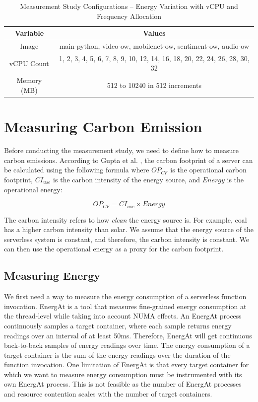 \documentclass[times, 10pt,twocolumn]{article}
\begin{document}
\begin{table}[htbp]
  \centering
  \begin{tabular}{|c|c|}
  \hline
  \textbf{Variable} & \textbf{Values} \\ \hline
  Image & main-python, video-ow, mobilenet-ow, sentiment-ow, audio-ow \\ \hline
  vCPU Count & 1, 2, 3, 4, 5, 6, 7, 8, 9, 10, 12, 14, 16, 18, 20, 22, 24, 26, 28, 30, 32 \\ \hline
  Memory (MB) & 512 to 10240 in 512 increments\\ \hline
  \end{tabular}
  \caption{Measurement Study Configurations -- Energy Variation with vCPU and Frequency Allocation}
  \label{tab:mstudy1_configurations}
\end{table}

\section{Measuring Carbon Emission}


Before conducting the measurement study, we need to define how to measure carbon emissions. According to Gupta et al. \cite{gupta2022act}, the carbon footprint of a server can be calculated using the following formula where $OP_{CF}$ is the operational carbon footprint, $CI_{use}$ is the carbon intensity of the energy source, and $Energy$ is the operational energy:

\begin{equation}
   OP_{CF} = CI_{use} \times Energy
\end{equation}

The carbon intensity refers to how \textit{clean} the energy source is. For example, coal has a higher carbon intensity than solar. We assume that the energy source of the serverless system is constant, and therefore, the carbon intensity is constant. We can then use the operational energy as a proxy for the carbon footprint.

\subsection{Measuring Energy}
We first need a way to measure the energy consumption of a serverless function invocation. EnergAt \cite{he2023hotcarbon} is a tool that measures fine-grained energy consumption at the thread-level while taking into account NUMA effects. An EnergAt process continuously samples a target container, where each sample returns energy readings over an interval of at least 50ms. Therefore, EnergAt will get continuous back-to-back samples of energy readings over time. The energy consumption of a target container is the sum of the energy readings over the duration of the function invocation. One limitation of EnergAt is that every target container for which we want to measure energy consumption must be instrumented with its own EnergAt process. This is not feasible as the number of EnergAt processes and resource contention scales with the number of target containers.
\end{document}
